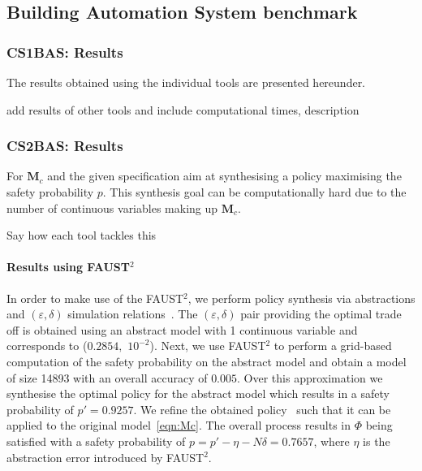 \documentclass[EPiC]{easychair}
\newcommand{\todo}[1]{
  \begin{framed}
    \noindent{\bf TODO: }
    #1
  \end{framed}
}
\begin{document}
\subsection{Building Automation System benchmark}
\subsubsection{CS1BAS: Results}
The results obtained using the individual tools are presented hereunder. 
\begin{figure}[htb]
\centering
{}
\end{figure}

\todo{add results of other tools and include computational times, description}

\subsubsection{CS2BAS: Results}
For $\mathbf{M}_c$ and the given specification  aim at synthesising a policy maximising the safety probability $p$. This synthesis goal can be computationally hard due to the  number of continuous variables making up $\mathbf{M}_c$. 
\todo{Say how each tool tackles this}

\paragraph{Results using FAUST$^2$}
In order to make use of the FAUST$^2$, we perform policy synthesis via abstractions and $(\varepsilon,\delta)$ simulation relations~\cite{peva}. The $(\varepsilon,\delta)$ pair providing the optimal trade off is obtained using an abstract model with 1 continuous variable and corresponds to ($0.2854,$ $ 10^{-2}$). 
Next, we use FAUST$^2$ to perform a grid-based computation of the safety probability on the abstract model and obtain a model of size 14893 with an overall accuracy of $0.005$. 
Over this approximation we synthesise the optimal policy for the abstract model which results in a safety probability of $p'= 0.9257$.	We refine the obtained policy~\cite{peva} such that it can be applied to the original model~\eqref{eqn:Mc}. The overall process results in $\Phi$ being satisfied with a safety probability of $p = p'-\eta - N\delta = 0.7657$, where $\eta$ is the abstraction error introduced by FAUST$^2$.
\end{document}
